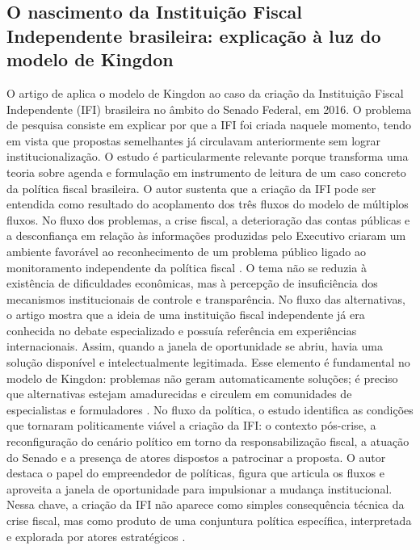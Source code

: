 \documentclass[12pt,a4paper]{article}
\begin{document}
\subsection{O nascimento da Instituição Fiscal Independente brasileira: explicação à luz do modelo de Kingdon}
\label{sec:org15ebecc}
O artigo de \textcite{bijos2024ifi} aplica o modelo de Kingdon ao caso da criação da Instituição Fiscal Independente (IFI) brasileira no âmbito do Senado Federal, em 2016. O problema de pesquisa consiste em explicar por que a IFI foi criada naquele momento, tendo em vista que propostas semelhantes já circulavam anteriormente sem lograr institucionalização. O estudo é particularmente relevante porque transforma uma teoria sobre agenda e formulação em instrumento de leitura de um caso concreto da política fiscal brasileira.
O autor sustenta que a criação da IFI pode ser entendida como resultado do acoplamento dos três fluxos do modelo de múltiplos fluxos. No fluxo dos problemas, a crise fiscal, a deterioração das contas públicas e a desconfiança em relação às informações produzidas pelo Executivo criaram um ambiente favorável ao reconhecimento de um problema público ligado ao monitoramento independente da política fiscal \autocite{bijos2024ifi}. O tema não se reduzia à existência de dificuldades econômicas, mas à percepção de insuficiência dos mecanismos institucionais de controle e transparência.
No fluxo das alternativas, o artigo mostra que a ideia de uma instituição fiscal independente já era conhecida no debate especializado e possuía referência em experiências internacionais. Assim, quando a janela de oportunidade se abriu, havia uma solução disponível e intelectualmente legitimada. Esse elemento é fundamental no modelo de Kingdon: problemas não geram automaticamente soluções; é preciso que alternativas estejam amadurecidas e circulem em comunidades de especialistas e formuladores \autocites{bijos2024ifi}{kingdon2003agendas}.
No fluxo da política, o estudo identifica as condições que tornaram politicamente viável a criação da IFI: o contexto pós-crise, a reconfiguração do cenário político em torno da responsabilização fiscal, a atuação do Senado e a presença de atores dispostos a patrocinar a proposta. O autor destaca o papel do empreendedor de políticas, figura que articula os fluxos e aproveita a janela de oportunidade para impulsionar a mudança institucional. Nessa chave, a criação da IFI não aparece como simples consequência técnica da crise fiscal, mas como produto de uma conjuntura política específica, interpretada e explorada por atores estratégicos \autocite{bijos2024ifi}.
\end{document}
